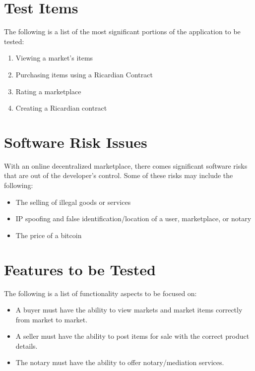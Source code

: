 \documentclass{article}
\begin{document}
\section*{Test Items}
The following is a list of the most significant portions of the application to be tested:
\newline
\begin{enumerate}
 \item
Viewing a market's items
 \item
Purchasing items using a Ricardian Contract
 \item
Rating a marketplace
\item
Creating a Ricardian contract
\end{enumerate}

\section*{Software Risk Issues}
With an online decentralized marketplace, there comes significant software risks that are out of the developer's control.
Some of these risks may include the following:
\newline
\begin{itemize}
 \item
The selling of illegal goods or services
 \item
IP spoofing and false identification/location of a user, marketplace, or notary
 \item
The price of a bitcoin
\end{itemize}

\section*{Features to be Tested}
The following is a list of functionality aspects to be focused on:
\newline
\begin{itemize}
 \item
A buyer must have the ability to view markets and market items correctly from market to market.
 \item
A seller must have the ability to post items for sale with the correct product details.
 \item
The notary must have the ability to offer notary/mediation services.
\end{itemize}
\end{document}

